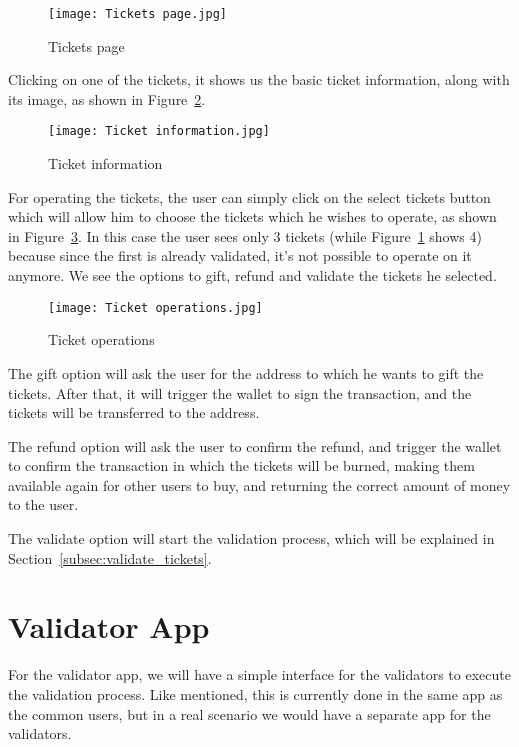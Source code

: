 \begin{figure}[H]
	\texttt{[image: Tickets page.jpg]}
	\centering
	\caption{Tickets page}\label{fig:tickets_page}
\end{figure}

Clicking on one of the tickets, it shows us the basic ticket information, along
with its image, as shown in Figure~\ref{fig:ticket_information}.

\begin{figure}[H]
	\texttt{[image: Ticket information.jpg]}
	\centering
	\caption{Ticket information}\label{fig:ticket_information}
\end{figure}

For operating the tickets, the user can simply click on the select tickets
button which will allow him to choose the tickets which he wishes to operate,
as shown in Figure~\ref{fig:ticket_operations}. In this case the user sees only
3 tickets (while Figure~\ref{fig:tickets_page} shows 4) because since the first
is already validated, it's not possible to operate on it anymore. We see the
options to gift, refund and validate the tickets he selected.

\begin{figure}[H]
	\texttt{[image: Ticket operations.jpg]}
	\centering
	\caption{Ticket operations}\label{fig:ticket_operations}
\end{figure}

The gift option will ask the user for the address to which he wants to gift the
tickets. After that, it will trigger the wallet to sign the transaction, and
the tickets will be transferred to the address.

The refund option will ask the user to confirm the refund, and trigger the
wallet to confirm the transaction in which the tickets will be burned, making
them available again for other users to buy, and returning the correct amount
of money to the user.

The validate option will start the validation process, which will be explained
in Section~\ref{subsec:validate_tickets}.

\section{Validator App}\label{sec:validator_app}

For the validator app, we will have a simple interface for the validators to
execute the validation process. Like mentioned, this is currently done in the
same app as the common users, but in a real scenario we would have a separate
app for the validators.

